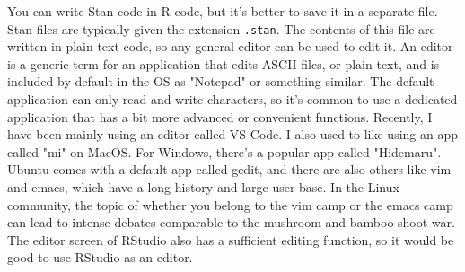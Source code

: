 \documentclass{ltjsbook}
\begin{document}
You can write Stan code in R code, but it's better to save it in a separate file. Stan files are typically given the extension \verb|.stan|. The contents of this file are written in plain text code, so any general editor can be used to edit it. An editor is a generic term for an application that edits ASCII files, or plain text, and is included by default in the OS as "Notepad" or something similar. The default application can only read and write characters, so it's common to use a dedicated application that has a bit more advanced or convenient functions.  Recently, I have been mainly using an editor called VS Code. I also used to like using an app called "mi" on MacOS. For Windows, there's a popular app called "Hidemaru". Ubuntu comes with a default app called gedit, and there are also others like vim and emacs, which have a long history and large user base. In the Linux community, the topic of whether you belong to the vim camp or the emacs camp can lead to intense debates comparable to the mushroom and bamboo shoot war. The editor screen of RStudio also has a sufficient editing function, so it would be good to use RStudio as an editor.
\end{document}

